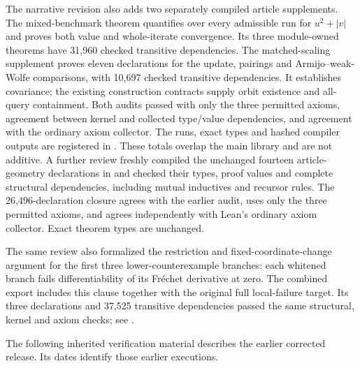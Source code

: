 The narrative revision also adds two separately compiled article supplements.
The mixed-benchmark theorem quantifies over every admissible
run for $u^2+|v|$ and proves both value and whole-iterate convergence. Its
three module-owned theorems have 31,960 checked transitive dependencies.
The matched-scaling supplement proves eleven declarations for the update,
pairings and Armijo--weak-Wolfe comparisons, with 10,697 checked transitive
dependencies. It establishes covariance; the existing construction contracts
supply orbit existence and all-query containment. Both audits passed with
only the three permitted axioms, agreement between kernel and collected
type/value dependencies, and agreement with the ordinary axiom collector.
The runs, exact types and hashed compiler outputs are registered in
. These totals
overlap the main library and are not additive. A further review
freshly compiled the unchanged fourteen article-geometry declarations in
 and checked their types, proof values and
complete structural dependencies, including mutual inductives and recursor
rules. The 26,496-declaration closure agrees with the earlier audit, uses only
the three permitted axioms, and agrees independently with Lean's ordinary axiom
collector. Exact theorem types are unchanged.

The same review also formalized the restriction and fixed-coordinate-change
argument for the first three lower-counterexample branches: each
whitened branch fails differentiability of its Fr\'echet derivative at zero.
The combined export includes this clause together with the original full
local-failure target. Its three declarations and 37,525 transitive
dependencies passed the same structural, kernel and axiom checks; see
.

The following inherited verification material describes the earlier corrected
release. Its dates identify those earlier executions.
